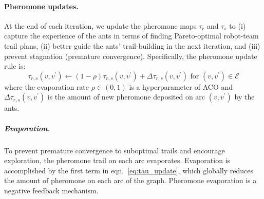\documentclass[11pt, oneside]{article}
\begin{document}
\paragraph{Pheromone updates.} At the end of each iteration, we update the pheromone maps $\tau_r$ and $\tau_s$ to (i) capture the experience of the ants in terms of finding Pareto-optimal robot-team trail plans, (ii) better guide the ants' trail-building in the next iteration, and (iii) prevent stagnation (premature convergence). Specifically, the pheromone update rule is:
\begin{equation}
	\tau_{r, s}(v, v^\prime) \leftarrow (1-\rho) \tau_{r,s}(v, v^\prime)  + \Delta \tau_{r,s}(v, v^\prime) \text{ for } (v, v^\prime) \in \mathcal{E} \label{eq:tau_update}
\end{equation}
where the evaporation rate $\rho \in (0, 1)$ is a hyperparameter of ACO and $\Delta \tau_{r,s}(v, v^\prime)$ is the amount of new pheromone deposited on arc $(v, v^\prime)$ by the ants.

\subparagraph{Evaporation.} To prevent premature convergence to suboptimal trails and encourage exploration, the pheromone trail on each arc evaporates. 
Evaporation is accomplished by the first term in eqn.~\ref{eq:tau_update}, which globally reduces the amount of pheromone on each arc of the graph. 
Pheromone evaporation is a negative feedback mechanism. 
\end{document}
